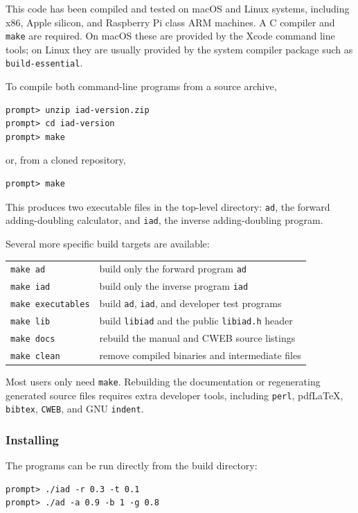 \documentclass{article}
\newcommand\pdflatex{pdf\LaTeX}
\newcommand\iadprog{\texttt{iad}}
\begin{document}
This code has been compiled and tested on macOS and Linux systems, including
x86, Apple silicon, and Raspberry Pi class ARM machines.  A C compiler and
\texttt{make} are required.  On macOS these are provided by the Xcode command
line tools; on Linux they are usually provided by the system compiler package
such as \texttt{build-essential}.

To compile both command-line programs from a source archive,
\begin{verbatim}
prompt> unzip iad-version.zip
prompt> cd iad-version
prompt> make
\end{verbatim}
or, from a cloned repository,
\begin{verbatim}
prompt> make
\end{verbatim}
This produces two executable files in the top-level directory:
\texttt{ad}, the forward adding-doubling calculator, and \iadprog{}, the
inverse adding-doubling program.

Several more specific build targets are available:
\begin{center}
\begin{tabular}{lp{7cm}}
\texttt{make ad}          & build only the forward program \texttt{ad}\\
\texttt{make iad}         & build only the inverse program \iadprog{}\\
\texttt{make executables} & build \texttt{ad}, \iadprog{}, and developer test programs\\
\texttt{make lib}         & build \texttt{libiad} and the public \texttt{libiad.h} header\\
\texttt{make docs}        & rebuild the manual and CWEB source listings\\
\texttt{make clean}       & remove compiled binaries and intermediate files\\
\end{tabular}
\end{center}

Most users only need \texttt{make}.  Rebuilding the documentation or
regenerating generated source files requires extra developer tools, including
\texttt{perl}, \pdflatex{}, \texttt{bibtex}, \texttt{CWEB}, and GNU
\texttt{indent}.

\subsubsection{Installing}

The programs can be run directly from the build directory:
\begin{verbatim}
prompt> ./iad -r 0.3 -t 0.1
prompt> ./ad -a 0.9 -b 1 -g 0.8
\end{verbatim}
\end{document}
